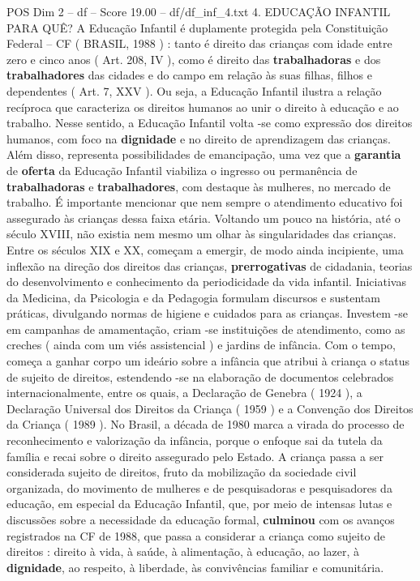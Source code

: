 \begin{textsample}{POS Dim 2 – df – Score 19.00 – df/df\_inf\_4.txt}  \label{ex:f2_pos_126}
4.
EDUCAÇÃO INFANTIL PARA QUÊ?
A Educação Infantil é duplamente protegida pela Constituição Federal – CF ( BRASIL, 1988 ) : tanto é direito das crianças com idade entre zero e cinco anos ( Art. 208, IV ), como é direito das \textbf{trabalhadoras} e dos \textbf{trabalhadores} das cidades e do campo em relação às suas filhas, filhos e dependentes ( Art. 7, XXV ).
Ou seja, a Educação Infantil ilustra a relação recíproca que caracteriza os direitos humanos ao unir o direito à educação e ao trabalho.
Nesse sentido, a Educação Infantil volta -se como expressão dos direitos humanos, com foco na \textbf{dignidade} e no direito de aprendizagem das crianças.
Além disso, representa possibilidades de emancipação, uma vez que a \textbf{garantia} de \textbf{oferta} da Educação Infantil viabiliza o ingresso ou permanência de \textbf{trabalhadoras} e \textbf{trabalhadores}, com destaque às mulheres, no mercado de trabalho.
É importante mencionar que nem sempre o atendimento educativo foi assegurado às crianças dessa faixa etária.
Voltando um pouco na história, até o século XVIII, não existia nem mesmo um olhar às singularidades das crianças.
Entre os séculos XIX e XX, começam a emergir, de modo ainda incipiente, uma inflexão na direção dos direitos das crianças, \textbf{prerrogativas} de cidadania, teorias do desenvolvimento e conhecimento da periodicidade da vida infantil.
Iniciativas da Medicina, da Psicologia e da Pedagogia formulam discursos e sustentam práticas, divulgando normas de higiene e cuidados para as crianças.
Investem -se em campanhas de amamentação, criam -se instituições de atendimento, como as creches ( ainda com um viés assistencial ) e jardins de infância.
Com o tempo, começa a ganhar corpo um ideário sobre a infância que atribui à criança o status de sujeito de direitos, estendendo -se na elaboração de documentos celebrados internacionalmente, entre os quais, a Declaração de Genebra ( 1924 ), a Declaração Universal dos Direitos da Criança ( 1959 ) e a Convenção dos Direitos da Criança ( 1989 ).
No Brasil, a década de 1980 marca a virada do processo de reconhecimento e valorização da infância, porque o enfoque sai da tutela da família e recai sobre o direito assegurado pelo Estado.
A criança passa a ser considerada sujeito de direitos, fruto da mobilização da sociedade civil organizada, do movimento de mulheres e de pesquisadoras e pesquisadores da educação, em especial da Educação Infantil, que, por meio de intensas lutas e discussões sobre a necessidade da educação formal, \textbf{culminou} com os avanços registrados na CF de 1988, que passa a considerar a criança como sujeito de direitos : direito à vida, à saúde, à alimentação, à educação, ao lazer, à \textbf{dignidade}, ao respeito, à liberdade, às convivências familiar e comunitária.

\end{textsample}
